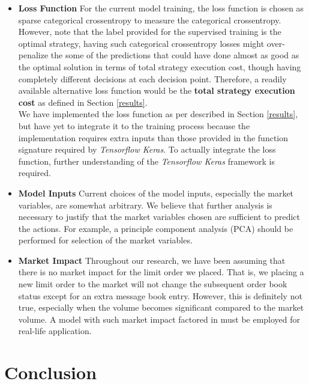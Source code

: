 \documentclass[12pt]{extarticle}
\begin{document}
\begin{itemize}
  \item \textbf{Loss Function} For the current model training, the loss function is chosen as
  sparse categorical crossentropy to measure the categorical crossentropy.
  However, note that the label provided for the supervised training is the optimal
  strategy, having such categorical crossentropy losses might over-penalize the
  some of the predictions that could have done almost as good as the optimal solution
  in terms of total strategy execution cost, though having completely different decisions
  at each decision point. Therefore, a readily available alternative loss function
  would be the \textbf{total strategy execution cost} as defined in Section \ref{results}.\\


  We have implemented the loss function as per described in Section \ref{results}, but have yet
  to integrate it to the training process because the implementation requires
  extra inputs than those provided in the function signature required by \textit{Tensorflow Keras}.
  To actually integrate the loss function, further understanding of the \textit{Tensorflow Keras}
  framework is required.

  \item \textbf{Model Inputs} Current choices of the model inputs, especially the
  market variables, are somewhat arbitrary. We believe that further analysis is necessary
  to justify that the market variables chosen are sufficient to predict the actions.
  For example, a principle component analysis (PCA) should be performed for selection of the
  market variables.

  \item \textbf{Market Impact} Throughout our research, we have been assuming that
  there is no market impact for the limit order we placed. That is, we placing a new
  limit order to the market will not change the subsequent order book status except
  for an extra message book entry. However, this is definitely not true, especially
  when the volume becomes significant compared to the market volume. A model with such
  market impact factored in \cite{market-impact} must be employed for real-life application.
\end{itemize}

\section{Conclusion}
\end{document}
